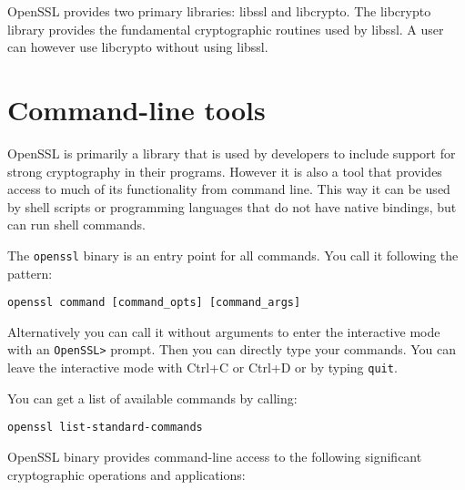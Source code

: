 OpenSSL provides two primary libraries: libssl and libcrypto. The libcrypto library provides the fundamental cryptographic routines used by libssl. A user can however use libcrypto without using libssl.


\section{Command-line tools}

OpenSSL is primarily a library that is used by developers to include support for strong cryptography in their programs. However it is also a tool that provides access to much of its functionality from command line. This way it can be used by shell scripts or programming languages that do not have native bindings, but can run shell commands. \cite{viega2002network}

The \texttt{openssl} binary is an entry point for all commands. You call it following the pattern:

\begin{verbatim}
openssl command [command_opts] [command_args]
\end{verbatim}

Alternatively you can call it without arguments to enter the interactive mode with an \texttt{OpenSSL>} prompt. Then you can directly type your commands. You can leave the interactive mode with Ctrl+C or Ctrl+D or by typing \texttt{quit}.

You can get a list of available commands by calling:

\begin{verbatim}
openssl list-standard-commands
\end{verbatim}

OpenSSL binary provides command-line access to the following significant cryptographic operations and applications:

